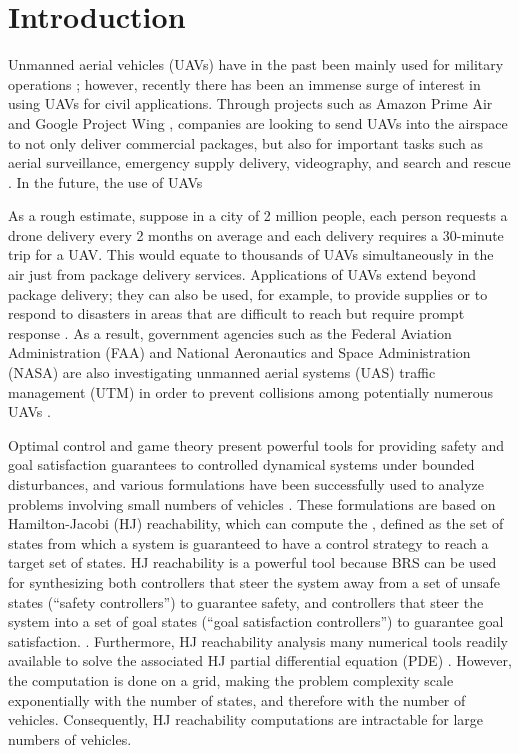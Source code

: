 \section{Introduction}
Unmanned aerial vehicles (UAVs) have in the past been mainly used for military operations \cite{Tice91}; however, recently there has been an immense surge of interest in using UAVs for civil applications. Through projects such as Amazon Prime Air \cite{PrimeAir} and Google Project Wing \cite{ProjectWing}, companies are looking to send UAVs into the airspace to not only deliver commercial packages, but also for important tasks such as aerial surveillance, emergency supply delivery, videography, and search and rescue \cite{Kopardekar16}. In the future, the use of UAVs 

As a rough estimate, suppose in a city of 2 million people, each person requests a drone delivery every 2 months on average and each delivery requires a 30-minute trip for a UAV. This would equate to thousands of UAVs simultaneously in the air just from package delivery services. Applications of UAVs extend beyond package delivery; they can also be used, for example, to provide supplies or to respond to disasters in areas that are difficult to reach but require prompt response \cite{Debusk10,Tornado16}. As a result, government agencies such as the Federal Aviation Administration (FAA) and National Aeronautics and Space Administration (NASA) are also investigating unmanned aerial systems (UAS) traffic management (UTM) in order to prevent collisions among potentially numerous UAVs \cite{Kopardekar16, FAA13, NASA16}. 

Optimal control and game theory present powerful tools for providing safety and goal satisfaction guarantees to controlled dynamical systems under bounded disturbances, and various formulations \cite{Bokanowski10, Mitchell05, Barron89} have been successfully used to analyze problems involving small numbers of vehicles \cite{Fisac15, Chen14, Chen17, Ding08}. These formulations are based on Hamilton-Jacobi (HJ) reachability, which can compute the , defined as the set of states from which a system is guaranteed to have a control strategy to reach a target set of states. HJ reachability is a powerful tool because BRS can be used for synthesizing both controllers that steer the system away from a set of unsafe states (``safety controllers'') to guarantee safety, and controllers that steer the system into a set of goal states (``goal satisfaction controllers'') to guarantee goal satisfaction. . Furthermore, HJ reachability analysis  many numerical tools readily available to solve the associated HJ partial differential equation (PDE) \cite{LSToolbox, Osher02, Sethian96}. However, the computation is done on a grid, making the problem complexity scale exponentially with the number of states, and therefore with the number of vehicles. Consequently, HJ reachability computations are intractable for large numbers of vehicles. 

